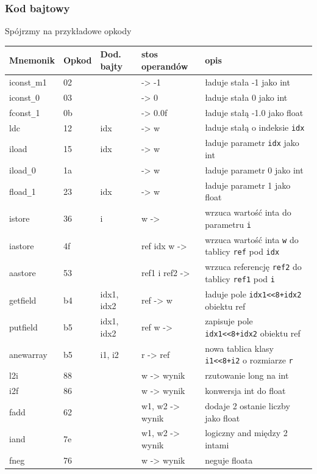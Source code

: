 \documentclass[a4paper,12pt]{article}
\begin{document}
\subsubsection{Kod bajtowy}
Spójrzmy na przykładowe opkody
\setlongtables
\begin{longtable}{|l|l|l|l|l|} %
\hline
Mnemonik & Opkod & Dod. bajty & stos operandów & opis \\
  \hline
  iconst\verb|_|m1 & 02 &  & -> -1 & ładuje stała -1 jako int\\
  \hline
  iconst\verb|_|0 & 03 &  & -> 0 & ładuje stała 0 jako int\\
  \hline
  fconst\verb|_|1 & 0b &  & -> 0.0f & ładuje stałą -1.0 jako float\\
  \hline
  ldc & 12 & idx & -> w & ładuje stałą o indeksie \verb|idx|\\
  \hline
  iload & 15 & idx & -> w & ładuje parametr \verb|idx| jako int\\
  \hline
  iload\verb|_|0 & 1a &  & -> w & ładuje parametr 0 jako int\\
  \hline
  fload\verb|_|1 & 23 & idx & -> w & ładuje parametr 1 jako float\\
  \hline
  istore & 36 & i & w -> & wrzuca wartość inta do parametru \verb|i|\\
  \hline
  iastore & 4f &  & ref idx w -> & wrzuca wartość inta \verb|w| do tablicy \verb|ref| pod \verb|idx|\\
  \hline
  aastore & 53 &  & ref1 i ref2 -> & wrzuca referencję \verb|ref2| do tablicy \verb|ref1| pod \verb|i|\\
  \hline
  getfield & b4 & idx1, idx2 & ref -> w & ładuje pole \verb|idx1<<8+idx2| obiektu ref\\
  \hline
  putfield & b5 & idx1, idx2 & ref w ->  & zapisuje pole \verb|idx1<<8+idx2| obiektu ref\\
  \hline
  anewarray & b5 & i1, i2 & r -> ref & nowa tablica klasy \verb|i1<<8+i2| o rozmiarze \verb|r|\\
  \hline
  l2i & 88 &  & w -> wynik & rzutowanie long na int\\
  \hline
  i2f & 86 &  & w -> wynik & konwersja int do float\\
  \hline
  fadd & 62 &  & w1, w2 -> wynik & dodaje 2 ostanie liczby jako float\\
  \hline
  iand & 7e &  & w1, w2 -> wynik & logiczny and między 2 intami\\
  \hline
  fneg & 76 &  & w -> wynik & neguje floata\\

\end{longtable}
\end{document}
